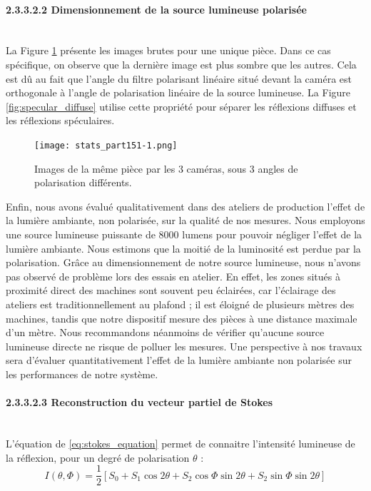 \paragraph{2.3.3.2.2 Dimensionnement de la source lumineuse polarisée}\mbox{} \\
La Figure \ref{fig:raw_measures} présente les images brutes pour une unique pièce.
Dans ce cas spécifique, on observe que la dernière image est plus sombre que les autres.
Cela est dû au fait que l'angle du filtre polarisant linéaire situé devant la caméra est orthogonale à l'angle de polarisation linéaire de la source lumineuse.
La Figure \ref{fig:specular_diffuse} utilise cette propriété pour séparer les réflexions diffuses et les réflexions spéculaires.

\begin{figure}[htbp]
	\centering
	\texttt{[image: stats\_part151-1.png]}
	\caption{Images de la même pièce par les 3 caméras, sous 3 angles de polarisation différents.}
	\label{fig:raw_measures}
\end{figure}

Enfin, nous avons évalué qualitativement dans des ateliers de production l'effet de la lumière ambiante, non polarisée, sur la qualité de nos mesures.
Nous employons une source lumineuse puissante de 8000 lumens pour pouvoir négliger l'effet de la lumière ambiante.
Nous estimons que la moitié de la luminosité est perdue par la polarisation.
Grâce au dimensionnement de notre source lumineuse, nous n'avons pas observé de problème lors des essais en atelier.
En effet, les zones situés à proximité direct des machines sont souvent peu éclairées, car l'éclairage des ateliers est traditionnellement au plafond ; il est éloigné de plusieurs mètres des machines, tandis que notre dispositif mesure des pièces à une distance maximale d'un mètre.
Nous recommandons néanmoins de vérifier qu'aucune source lumineuse directe ne risque de polluer les mesures.
Une perspective à nos travaux sera d'évaluer quantitativement l'effet de la lumière ambiante non polarisée sur les performances de notre système.

\paragraph{2.3.3.2.3 Reconstruction du vecteur partiel de Stokes}\mbox{} \\
L'équation de \citeauthor{stokes_composition_1851} \ref{eq:stokes_equation} permet de connaitre l'intensité lumineuse de la réflexion, pour un degré de polarisation $\theta$ \cite{stokes_composition_1851} :
\begin{equation} \label{eq:stokes_equation}
	I(\theta,\Phi) = \frac{1}{2}[S_0+S_1\cos 2\theta+S_2\cos \Phi \sin 2\theta+S_2\sin \Phi \sin 2\theta]
\end{equation}

